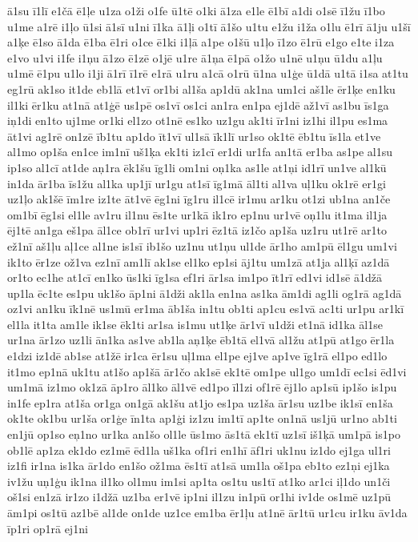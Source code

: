 {ā1su
ī1lī
e1čā
ē1ļe
u1za
o1ži
o1fe
ū1tē
o1ki
ā1za
e1le
ē1bī
a1di
o1sē
ī1žu
ī1bo
u1me
a1rē
i1ļo
ū1si
ā1sī
u1ni
ī1ka
ā1ļi
o1tī
ā1šo
u1tu
e1žu
i1ža
o1lu
ē1rī
ā1ju
u1šī
a1ķe
ē1so
ā1da
ē1ba
ē1ri
o1ce
ē1ki
i1ļā
a1pe
o1šū
u1ļo
ī1zo
ē1rū
e1go
e1te
i1za
e1vo
u1vi
i1fe
i1ņu
ā1zo
ē1zē
o1jē
u1re
ā1ņa
ē1pā
o1žo
u1nē
u1ņu
ū1du
a1ļu
u1mē
ē1pu
u1lo
i1ji
ā1rī
ī1rē
e1rā
u1ru
a1cā
o1rū
ū1na
u1ģe
ū1dā
u1tā
i1sa
at1tu
eg1rū
ak1so
it1de
eb1lā
et1vī
or1bi
al1ša
ap1dū
ak1na
um1ci
aš1le
ēr1ķe
en1ku
il1ki
ēr1ku
at1nā
at1ģē
us1pē
os1vī
os1ci
an1ra
en1pa
ej1dē
až1vī
as1bu
īs1ga
iņ1di
en1to
uj1me
or1ki
el1zo
ot1nē
es1ko
uz1gu
ak1ti
īr1ni
iz1hi
il1pu
es1ma
āt1vi
ag1rē
on1zē
īb1tu
ap1do
īt1vī
ul1sā
īk1lī
ur1so
ok1tē
ēb1tu
īs1la
et1ve
al1mo
op1ša
en1ce
im1nī
uš1ķa
ek1ti
iz1cī
er1di
ur1fa
an1tā
er1ba
as1pe
al1su
ip1so
al1cī
at1de
aņ1ra
ēk1šu
īg1li
om1ni
oņ1ka
as1le
at1ņi
id1rī
un1ve
al1kū
in1da
ār1ba
īs1žu
al1ka
up1jī
ur1gu
at1sī
īg1mā
āl1ti
al1va
uļ1ku
ok1rē
er1gi
uz1ļo
ak1šē
īm1re
iz1te
āt1vē
ēg1ni
īg1ru
il1cē
ir1mu
ar1ku
ot1zi
ub1na
an1če
om1bī
ēg1si
el1le
av1ru
il1nu
ēs1te
ur1kā
ik1ro
ep1nu
ur1vē
oņ1lu
it1ma
il1ja
ēj1tē
an1ga
eš1pa
āl1ce
ob1rī
ur1vi
up1ri
ēz1tā
iz1čo
ap1ša
uz1ru
ut1rē
ar1to
ež1nī
aš1ļu
aļ1ce
al1ne
is1sī
ib1šo
uz1nu
ut1ņu
ul1de
ār1ho
am1pū
ēl1gu
um1vi
ik1to
ēr1ze
ož1va
ez1nī
am1lī
ak1se
el1ko
ep1si
āj1tu
um1zā
at1ja
al1ķī
az1dā
or1to
ec1he
at1cī
en1ko
ūs1ki
īg1sa
ef1ri
ār1sa
im1po
īt1rī
ed1vi
id1sē
ā1džā
up1la
ēc1te
es1pu
uk1šo
āp1ni
ā1dži
ak1la
en1na
as1ka
ām1di
ag1li
og1rā
ag1dā
oz1vi
an1ku
īk1nē
us1mū
er1ma
āb1ša
in1tu
ob1ti
ap1cu
es1vā
ac1ti
ur1pu
ar1kī
el1la
it1ta
am1le
ik1se
ēk1ti
ar1sa
is1mu
ut1ķe
ār1vī
u1dži
et1nā
id1ka
āl1se
ur1na
ār1zo
uz1li
ān1ka
as1ve
ab1la
aņ1ķe
ēb1tā
el1vā
al1žu
at1pū
at1go
ēr1la
e1dzi
iz1dē
ab1se
at1žē
ir1ca
ēr1su
uļ1ma
el1pe
ej1ve
ap1ve
īg1rā
el1po
ed1lo
it1mo
ep1nā
uk1tu
at1šo
ap1šā
ār1čo
ak1sē
ek1tē
om1pe
ul1go
um1dī
ec1si
ēd1vi
um1mā
iz1mo
ok1zā
āp1ro
āl1ko
āl1vē
ed1po
īl1zi
of1rē
ēj1lo
ap1sū
ip1šo
is1pu
in1fe
ep1ra
at1ša
or1ga
on1gā
ak1šu
at1jo
es1pa
uz1ša
ār1su
uz1be
ik1sī
en1ša
ok1te
ok1bu
ur1ša
or1ģe
īn1ta
ap1ģi
iz1zu
im1tī
ap1te
on1nā
us1jū
ur1no
ab1ti
en1jū
op1so
eņ1no
ur1ka
an1šo
ol1le
ūs1mo
ās1tā
ek1tī
uz1sī
iš1ķā
um1pā
is1po
ob1lē
ap1za
ek1do
ez1mē
ēd1la
uš1ka
of1ri
en1hī
āf1ri
uk1nu
iz1do
ej1ga
ul1ri
iz1fi
ir1na
is1ka
ār1do
en1šo
ož1ma
ēs1tī
at1sā
um1la
oš1pa
eb1to
ez1ņi
ej1ka
iv1žu
uņ1ģu
ik1na
il1ko
ol1mu
im1si
ap1ta
os1tu
us1tī
at1ko
ar1ci
iļ1do
un1či
oš1si
en1zā
ir1zo
i1džā
uz1ba
er1vē
ip1ni
il1zu
in1pū
or1hi
iv1de
os1mē
uz1pū
ām1pi
os1tū
az1bē
al1de
on1de
uz1ce
em1ba
ēr1ļu
at1nē
ār1tū
ur1cu
ir1ku
āv1da
īp1ri
op1rā
ej1ni
}
